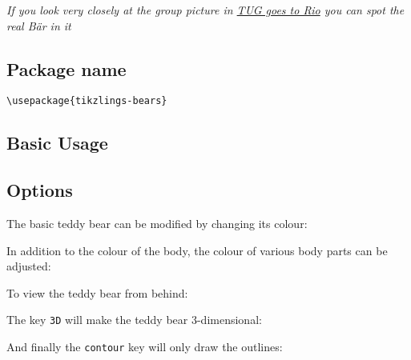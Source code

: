 \documentclass[parskip=half]{scrartcl}
\begin{document}
\emph{If you look very closely at the group picture in \href{https://www.tug.org/TUGboat/tb39-2/tb122wright-tug18.pdf}{TUG goes to Rio} you can spot the real B\"ar in it}

\subsection{Package name}

\begin{tcolorbox}[lower separated=false, lefthand width=.8\linewidth]
\vspace*{0.5cm}
\lstinline|\usepackage{tikzlings-bears}| 
\vspace*{0.5cm}
\end{tcolorbox}

\subsection{Basic Usage}

\begin{tcblisting}{}
\bear
\end{tcblisting}

\subsection{Options}

The basic teddy bear can be modified by changing its colour:
\begin{tcblisting}{}
\bear[body=blue]
\end{tcblisting}

In addition to the colour of the body, the colour of various body parts can be adjusted:
\begin{tcblisting}{}
\bear[eye=red]
\end{tcblisting}
\begin{tcblisting}{}
\bear[mouth=red]
\end{tcblisting}

To view the teddy bear from behind:
\begin{tcblisting}{}
\bear[back]
\end{tcblisting}

The key \lstinline|3D| will make the teddy bear 3-dimensional:
\begin{tcblisting}{}
\bear[3D]
\end{tcblisting}

And finally the \lstinline|contour| key will only draw the outlines:
\begin{tcblisting}{}
\bear[contour=black]
\end{tcblisting}
\end{document}
